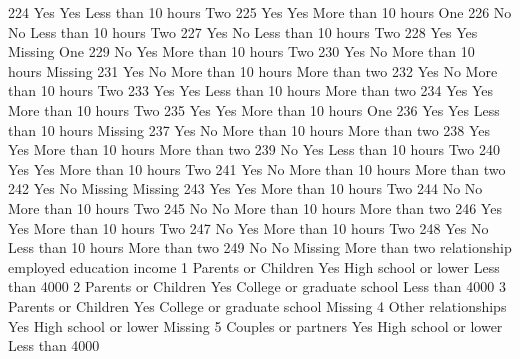 \documentclass[
  letterpaper,
  DIV=11,
  numbers=noendperiod]{scrreprt}
\newenvironment{Shaded}{\begin{snugshade}}{\end{snugshade}}
\newcommand{\NormalTok}[1]{\textcolor[rgb]{0.00,0.23,0.31}{#1}}
\begin{document}
\begin{Shaded}
\begin{Highlighting}[]
\NormalTok{224               Yes            Yes Less than 10 hours           Two}
\NormalTok{225               Yes            Yes More than 10 hours           One}
\NormalTok{226                No             No Less than 10 hours           Two}
\NormalTok{227               Yes             No Less than 10 hours           Two}
\NormalTok{228               Yes            Yes            Missing           One}
\NormalTok{229                No            Yes More than 10 hours           Two}
\NormalTok{230               Yes             No More than 10 hours       Missing}
\NormalTok{231               Yes             No More than 10 hours More than two}
\NormalTok{232               Yes             No More than 10 hours           Two}
\NormalTok{233               Yes            Yes Less than 10 hours More than two}
\NormalTok{234               Yes            Yes More than 10 hours           Two}
\NormalTok{235               Yes            Yes More than 10 hours           One}
\NormalTok{236               Yes            Yes Less than 10 hours       Missing}
\NormalTok{237               Yes             No More than 10 hours More than two}
\NormalTok{238               Yes            Yes More than 10 hours More than two}
\NormalTok{239                No            Yes Less than 10 hours           Two}
\NormalTok{240               Yes            Yes More than 10 hours           Two}
\NormalTok{241               Yes             No More than 10 hours More than two}
\NormalTok{242               Yes             No            Missing       Missing}
\NormalTok{243               Yes            Yes More than 10 hours           Two}
\NormalTok{244                No             No More than 10 hours           Two}
\NormalTok{245                No             No More than 10 hours More than two}
\NormalTok{246               Yes            Yes More than 10 hours           Two}
\NormalTok{247                No            Yes More than 10 hours           Two}
\NormalTok{248               Yes             No Less than 10 hours More than two}
\NormalTok{249                No             No            Missing More than two}
\NormalTok{           relationship employed                  education         income}
\NormalTok{1   Parents or Children      Yes       High school or lower Less than 4000}
\NormalTok{2   Parents or Children      Yes College or graduate school Less than 4000}
\NormalTok{3   Parents or Children      Yes College or graduate school        Missing}
\NormalTok{4   Other relationships      Yes       High school or lower        Missing}
\NormalTok{5   Couples or partners      Yes       High school or lower Less than 4000}

\end{Highlighting}
\end{Shaded}
\end{document}
